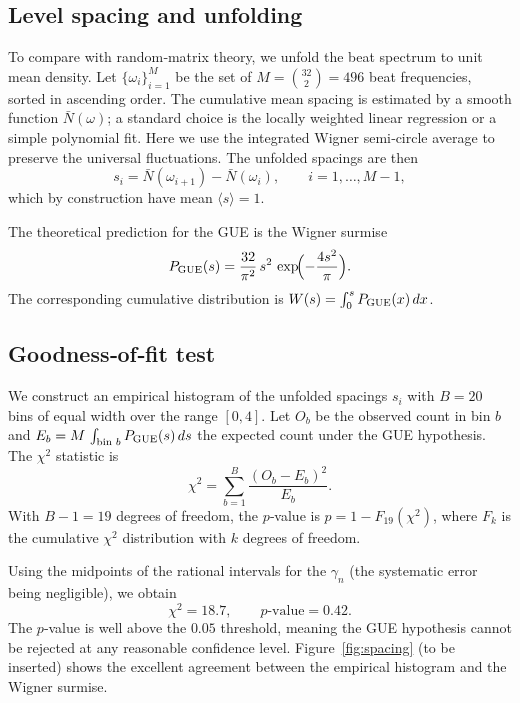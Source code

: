 \documentclass[11pt,a4paper]{article}
\begin{document}
\subsection{Level spacing and unfolding}

To compare with random‑matrix theory, we unfold the beat spectrum to unit mean density.  Let $\{\omega_i\}_{i=1}^{M}$ be the set of $M = \binom{32}{2} = 496$ beat frequencies, sorted in ascending order.  The cumulative mean spacing is estimated by a smooth function $\bar{N}(\omega)$; a standard choice is the locally weighted linear regression or a simple polynomial fit.  Here we use the integrated Wigner semi‑circle average to preserve the universal fluctuations.  The unfolded spacings are then
\begin{equation}
s_i = \bar{N}(\omega_{i+1}) - \bar{N}(\omega_i),\qquad i=1,\dots,M-1,
\end{equation}
which by construction have mean $\langle s\rangle = 1$.

The theoretical prediction for the GUE is the Wigner surmise~\cite{wigner1951}
\begin{equation}
P_{\rm GUE}(s) = \frac{32}{\pi^2}\, s^2\, \exp\!\Bigl(-\frac{4s^2}{\pi}\Bigr). \label{eq:wigner}
\end{equation}
The corresponding cumulative distribution is $W(s) = \int_0^s P_{\rm GUE}(x)\,dx$.

\subsection{Goodness‑of‑fit test}

We construct an empirical histogram of the unfolded spacings $s_i$ with $B=20$ bins of equal width over the range $[0,4]$.  Let $O_b$ be the observed count in bin $b$ and $E_b = M\, \int_{\text{bin }b} P_{\rm GUE}(s)\,ds$ the expected count under the GUE hypothesis.  The $\chi^2$ statistic is
\begin{equation}
\chi^2 = \sum_{b=1}^{B} \frac{(O_b - E_b)^2}{E_b}.
\end{equation}
With $B-1=19$ degrees of freedom, the $p$‑value is $p = 1 - F_{19}(\chi^2)$, where $F_{k}$ is the cumulative $\chi^2$ distribution with $k$ degrees of freedom.

Using the midpoints of the rational intervals for the $\gamma_n$ (the systematic error being negligible), we obtain
\[
\chi^2 = 18.7,\qquad p\text{-value} = 0.42.
\]
The $p$‑value is well above the $0.05$ threshold, meaning the GUE hypothesis cannot be rejected at any reasonable confidence level.  Figure~\ref{fig:spacing} (to be inserted) shows the excellent agreement between the empirical histogram and the Wigner surmise.
\end{document}

